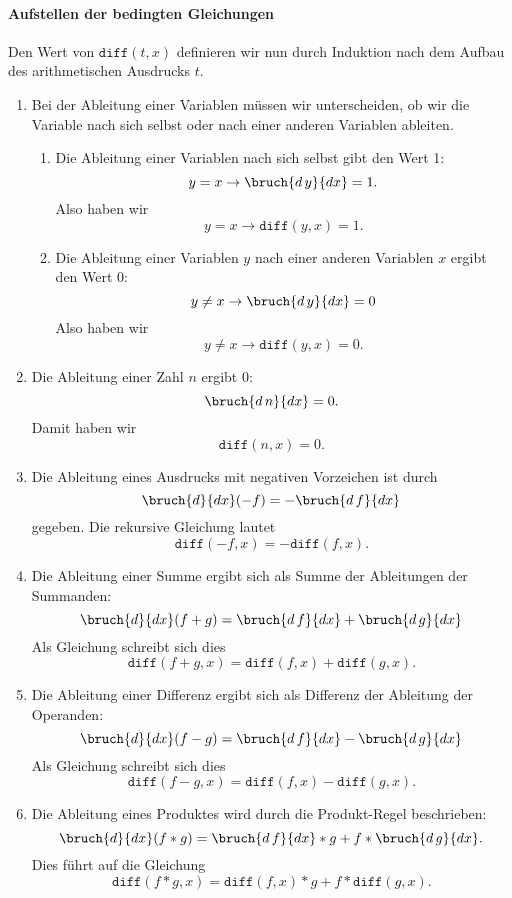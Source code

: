 \paragraph{Aufstellen der bedingten Gleichungen}
Den Wert von $\texttt{diff}(t,x)$ definieren wir nun durch Induktion nach dem Aufbau des
arithmetischen Ausdrucks $t$.
\begin{enumerate}
\item Bei der Ableitung einer Variablen m\"{u}ssen wir unterscheiden,
      ob wir die Variable nach sich selbst oder nach einer anderen Variablen ableiten.
      \begin{enumerate}
      \item Die Ableitung einer Variablen nach sich selbst gibt den Wert 1:
            \[ y = x \rightarrow \bruch{d\,y}{dx} = 1. \]
            Also haben wir 
            \[ y = x \rightarrow \texttt{diff}(y,x) = 1. \]
      \item Die Ableitung einer Variablen $y$ nach einer anderen Variablen $x$ ergibt den Wert 0:
            \[ y \not= x \rightarrow \bruch{d\,y}{dx} = 0 \]
             Also haben wir 
            \[ y \not= x \rightarrow \texttt{diff}(y,x) = 0. \]
      \end{enumerate}
\item Die Ableitung einer Zahl $n$ ergibt 0: 
      \[ \bruch{d\,n}{dx} = 0.  \]
      Damit haben wir
      \[ \texttt{diff}(n, x) = 0. \]
\item Die Ableitung eines Ausdrucks mit negativen Vorzeichen ist durch 
      \[ \bruch{d}{dx}(-f) = - \bruch{d\,f}{dx} \]
      gegeben.  Die rekursive Gleichung lautet 
      \[ \texttt{diff}(-f,x) = - \texttt{diff}(f,x). \]
\item Die Ableitung einer Summe ergibt sich als Summe der Ableitungen der Summanden: 
      \[ \bruch{d}{dx}(f+g) = \bruch{d\,f}{dx} + \bruch{d\,g}{dx} \]
      Als Gleichung schreibt sich dies 
      \[ \texttt{diff}(f + g, x) = \texttt{diff}(f,x) + \texttt{diff}(g,x). \]
\item Die Ableitung einer Differenz ergibt sich als Differenz der Ableitung der Operanden: 
      \[ \bruch{d}{dx}(f-g) = \bruch{d\,f}{dx} - \bruch{d\,g}{dx} \]
      Als Gleichung schreibt sich dies 
      \[ \texttt{diff}(f - g, x) = \texttt{diff}(f,x) - \texttt{diff}(g,x). \]
\item Die Ableitung eines Produktes wird durch die Produkt-Regel beschrieben: 
      \[ \bruch{d}{dx}(f*g) = \bruch{d\,f}{dx}*g + f*\bruch{d\,g}{dx}. \]
      Dies f\"{u}hrt auf die Gleichung 
      \[ \texttt{diff}(f*g,x) = \texttt{diff}(f,x) * g + f * \texttt{diff}(g,x). \]

\end{enumerate}
